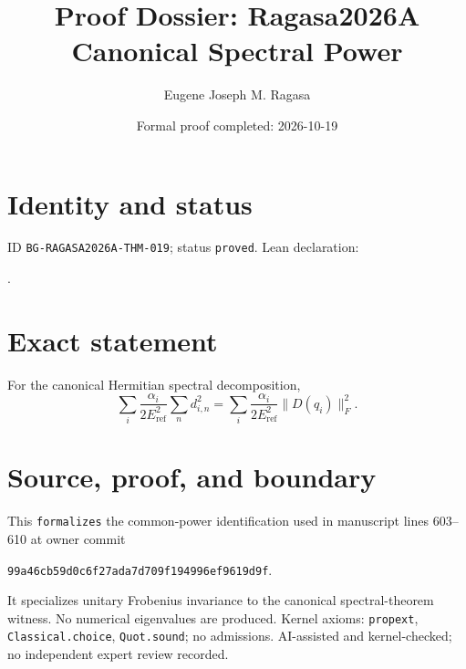 \documentclass[11pt]{article}
\title{Proof Dossier: Ragasa2026A Canonical Spectral Power}\author{Eugene Joseph M. Ragasa}\date{Formal proof completed: 2026-10-19}
\begin{document}
\maketitle
\section{Identity and status}
ID \texttt{BG-RAGASA2026A-THM-019}; status \texttt{proved}. Lean declaration:
\par{}.
\section{Exact statement}
For the canonical Hermitian spectral decomposition,
\[\sum_i\frac{\alpha_i}{2E_{\mathrm{ref}}^2}\sum_n d_{i,n}^2
 =\sum_i\frac{\alpha_i}{2E_{\mathrm{ref}}^2}\lVert D(q_i)\rVert_F^2.\]
\section{Source, proof, and boundary}
This \texttt{formalizes} the common-power identification used in manuscript lines
603--610 at owner commit
\begin{center}\small\texttt{99a46cb59d0c6f27ada7d709f194996ef9619d9f}.\end{center}
It specializes unitary Frobenius invariance to the canonical spectral-theorem witness.
No numerical eigenvalues are produced. Kernel axioms: \texttt{propext},
\texttt{Classical.choice}, \texttt{Quot.sound}; no admissions. AI-assisted and
kernel-checked; no independent expert review recorded.
\end{document}
